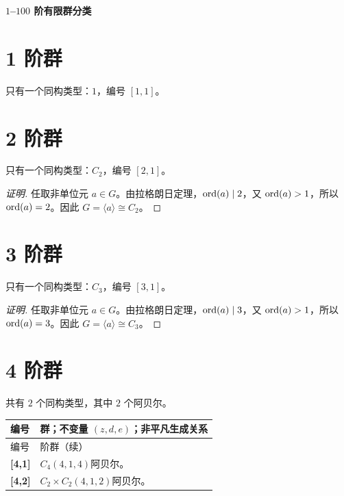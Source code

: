 \documentclass[UTF8,fontset=fandol,11pt,a4paper]{ctexart}
\begin{document}
\begin{center}{\LARGE\bfseries $1$--$100$ 阶有限群分类}\end{center}


\section*{1 阶群}\label{order:1}

只有一个同构类型：$1$，编号 $[1,1]$。

\section*{2 阶群}\label{order:2}

只有一个同构类型：$C_{2}$，编号 $[2,1]$。

\begin{proof}[证明]
任取非单位元 $a\in G$。由拉格朗日定理，$\operatorname{ord}(a)\mid 2$，又 $\operatorname{ord}(a)>1$，所以 $\operatorname{ord}(a)=2$。因此 $G=\langle a\rangle\cong C_{2}$。
\end{proof}

\section*{3 阶群}\label{order:3}

只有一个同构类型：$C_{3}$，编号 $[3,1]$。

\begin{proof}[证明]
任取非单位元 $a\in G$。由拉格朗日定理，$\operatorname{ord}(a)\mid 3$，又 $\operatorname{ord}(a)>1$，所以 $\operatorname{ord}(a)=3$。因此 $G=\langle a\rangle\cong C_{3}$。
\end{proof}

\section*{4 阶群}\label{order:4}

共有 $2$ 个同构类型，其中 $2$ 个阿贝尔。

\begingroup\small\setlength{\tabcolsep}{3pt}\renewcommand{\arraystretch}{1.12}

\begin{longtable}{@{}p{17mm}>{\raggedright\arraybackslash}p{141mm}@{}}

\toprule 编号 & 群；不变量 $(z,d,e)$；非平凡生成关系\\\midrule\endfirsthead

\toprule 编号 & 4 阶群（续）\\\midrule\endhead\bottomrule\endfoot

\textbf{[4,1]} & $C_{4}$\quad $(4,1,4)$\quad 阿贝尔。\\[3pt]

\textbf{[4,2]} & $C_{2}\times C_{2}$\quad $(4,1,2)$\quad 阿贝尔。\\[3pt]

\end{longtable}\endgroup
\end{document}
